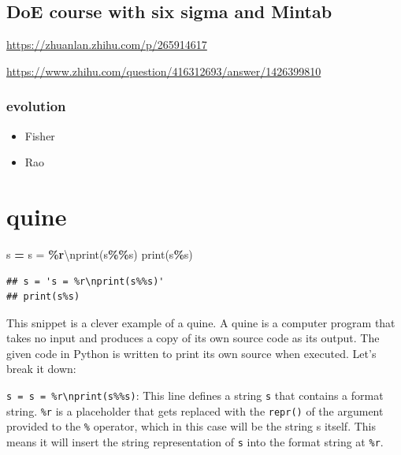 \documentclass[
]{book}
\newenvironment{Shaded}{\begin{snugshade}}{\end{snugshade}}
\newcommand{\BuiltInTok}[1]{#1}
\newcommand{\CharTok}[1]{\textcolor[rgb]{0.31,0.60,0.02}{#1}}
\newcommand{\NormalTok}[1]{#1}
\newcommand{\OperatorTok}[1]{\textcolor[rgb]{0.81,0.36,0.00}{\textbf{#1}}}
\newcommand{\SpecialCharTok}[1]{\textcolor[rgb]{0.81,0.36,0.00}{\textbf{#1}}}
\newcommand{\StringTok}[1]{\textcolor[rgb]{0.31,0.60,0.02}{#1}}
\providecommand{\tightlist}{%
  \setlength{\itemsep}{0pt}\setlength{\parskip}{0pt}}
\theoremstyle{definition}
\theoremstyle{definition}
\theoremstyle{definition}
\theoremstyle{definition}
\theoremstyle{remark}
\begin{document}
\hypertarget{doe-course-with-six-sigma-and-mintab}{%
\section{DoE course with six sigma and Mintab}\label{doe-course-with-six-sigma-and-mintab}}

\url{https://zhuanlan.zhihu.com/p/265914617}

\url{https://www.zhihu.com/question/416312693/answer/1426399810}

\hypertarget{evolution}{%
\subsection{evolution}\label{evolution}}

\begin{itemize}
\tightlist
\item
  Fisher
\item
  Rao
\end{itemize}

\hypertarget{quine}{%
\chapter{quine}\label{quine}}

\begin{Shaded}
\begin{Highlighting}[]
\NormalTok{s }\OperatorTok{=} \StringTok{\textquotesingle{}s = }\SpecialCharTok{\%r}\CharTok{\textbackslash{}n}\StringTok{print(s}\SpecialCharTok{\%\%}\StringTok{s)\textquotesingle{}}
\BuiltInTok{print}\NormalTok{(s}\OperatorTok{\%}\NormalTok{s)}
\end{Highlighting}
\end{Shaded}

\begin{verbatim}
## s = 's = %r\nprint(s%%s)'
## print(s%s)
\end{verbatim}

This snippet is a clever example of a quine. A quine is a computer program that takes no input and produces a copy of its own source code as its output. The given code in Python is written to print its own source when executed. Let's break it down:

\texttt{s\ =\ \textquotesingle{}s\ =\ \%r\textbackslash{}nprint(s\%\%s)\textquotesingle{}}: This line defines a string \texttt{s} that contains a format string. \texttt{\%r} is a placeholder that gets replaced with the \texttt{repr()} of the argument provided to the \texttt{\%} operator, which in this case will be the string s itself. This means it will insert the string representation of \texttt{s} into the format string at \texttt{\%r}.
\end{document}
